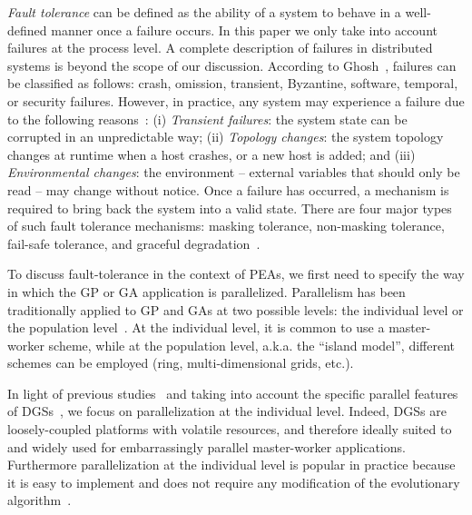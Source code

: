\documentclass[graybox]{sty/svmult}
\begin{document}
\emph{Fault tolerance} can be defined as the ability of a system to behave in a
well-defined manner once a failure occurs. In this paper we only take
into account failures at the process level. A complete description of
failures in distributed systems is beyond the scope of our discussion.
According to Ghosh~\cite{distributed-systems}, failures can be classified
as follows: crash, omission, transient, Byzantine, software, temporal,
or security failures.
However, in practice, any system may experience a failure due to the following
reasons~\cite{distributed-systems}: (i) \emph{Transient failures}: the
system state can be corrupted in an unpredictable way; (ii) \emph{Topology
changes}: the system topology changes at runtime when a host crashes,
or a new host is added; and (iii) \emph{Environmental changes}: the
environment -- external variables that should only be read -- may change
without notice.  Once a failure has occurred, a mechanism
is required to bring back the system into a valid state. There
are four major types of such fault tolerance mechanisms: masking tolerance,
non-masking tolerance, fail-safe tolerance, and graceful
degradation~\cite{distributed-systems}.

To discuss fault-tolerance in the context of PEAs, we
first need to specify the way in which the GP or GA application is
parallelized.  Parallelism has been traditionally applied to
GP and GAs at two possible levels: the individual level or the population
level~\cite{spatially-structured-EAs,parallel-ga-survey,modelo-islas2,parallel-eas}.
At the individual level, it is common to use a master-worker scheme,
while at the population level, a.k.a. the ``island model'', different
schemes can be employed (ring, multi-dimensional grids, etc.).

In light of previous studies~\cite{spatially-structured-EAs,modelo-islas2}
and taking into account the specific parallel features
of DGSs~\cite{dgc-caracteristicas,traces-dgc}, we focus on
parallelization at the individual level. Indeed, DGSs are
loosely-coupled platforms with volatile resources, and therefore
ideally suited to and widely used for embarrassingly parallel
master-worker applications. Furthermore parallelization at the
individual level is popular in practice because it is easy to
implement and does not require any modification of the evolutionary
algorithm~\cite{parallel-ga-survey,modelo-islas2,parallel-eas}.
\end{document}
